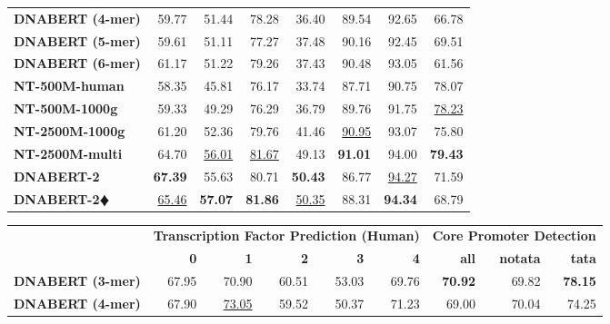 \documentclass{article}
\begin{document}
\begin{table}[H]
\begin{tabular}{lrrrrrrr}
		{\textbf{DNABERT (4-mer)} } &  59.77 & 51.44 & 78.28 & 36.40 & 89.54 & 92.65 & 66.78\\

            {\textbf{DNABERT (5-mer)} } & 59.61 & 51.11 & 77.27 & 37.48  & 90.16 & 92.45 & 69.51\\

            {\textbf{DNABERT (6-mer) } } & 61.17 & 51.22 & 79.26 & 37.43 &  90.48 & 93.05 & 61.56\\

            {\textbf{NT-500M-human} } & 58.35 & 45.81 & 76.17 & 33.74 & 87.71 & 90.75 & 78.07 \\

            {\textbf{NT-500M-1000g} } &  59.33 & 49.29 & 76.29 & 36.79 & 89.76 & 91.75 & \underline{78.23} \\

            {\textbf{NT-2500M-1000g} } & 61.20 & 52.36 & 79.76 & 41.46 & \underline{90.95} & 93.07 & 75.80 \\

            {\textbf{NT-2500M-multi} } & 64.70 & \underline{56.01} & \underline{81.67} & 49.13 & \textbf{91.01} & 94.00 & \textbf{79.43} \\

		
		\midrule

            {\textbf{DNABERT-2} } & \textbf{67.39} & 55.63 & 80.71 & \textbf{50.43}   & 86.77 & \underline{94.27} & 71.59 \\

            {\textbf{DNABERT-2$\vardiamondsuit$} } &  \underline{65.46} & \textbf{57.07} & \textbf{81.86} & \underline{50.35} & 88.31 & \textbf{94.34} & 68.79\\
		\bottomrule
	\end{tabular}


        \begin{tabular}{lrrrrrrrr}
		\toprule
  & \multicolumn{5}{c}{\textbf{Transcription Factor Prediction (Human)}} & \multicolumn{3}{c}{\textbf{Core Promoter Detection}} \\
		\cmidrule(lr){2-6}  \cmidrule(lr){7-9}
		& \textbf{ 0 } & \textbf{ 1 } & \textbf{ 2 } & \textbf{ 3 } & \textbf{4} & \textbf{all} & \textbf{notata} & \textbf{tata} \\
		\midrule
		{\textbf{DNABERT (3-mer)} } & 67.95 & 70.90 & 60.51 & 53.03 & 69.76 & \textbf{70.92} & 69.82 & \textbf{78.15} \\
		
		{\textbf{DNABERT (4-mer)} } & 67.90 & \underline{73.05} & 59.52 & 50.37 & 71.23 & 69.00 & 70.04 & 74.25\\


\end{tabular}
\end{table}
\end{document}
